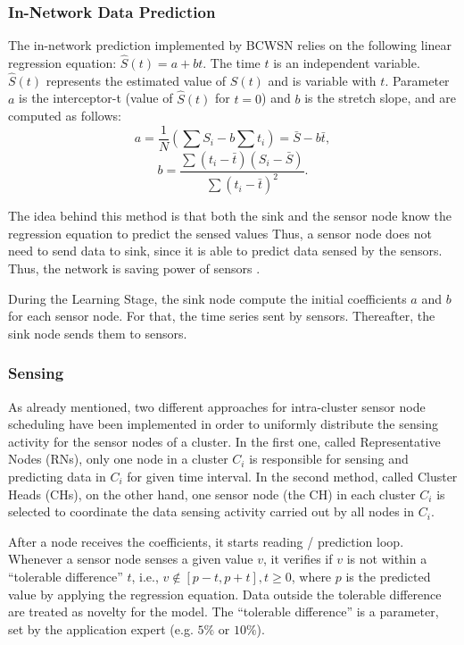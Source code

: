 \documentclass[conference]{IEEEtran}
\begin{document}
\subsubsection{In-Network Data Prediction}
\label{data-predict}


The in-network prediction implemented by BCWSN relies on the
following linear regression equation: $\hat{S}(t) = a + bt$.
The time $t$ is an independent variable. $\hat{S}(t)$ represents the estimated
value of $S(t)$ and is variable with $t$. Parameter $a$ is the interceptor-t
(value of $\hat{S}(t)$ for $t=0$) and $b$ is the stretch slope, and are computed
as follows:
\begin{equation}
	a = \frac{1}{N}\left(\sum S_{i} - b\sum t_{i} \right) = \bar{S} - b\bar{t},
\end{equation}
\vspace*{-.3cm}
\begin{equation}
	b = \frac{\sum \left(t_{i} - \bar{t}\right)\left(S_{i} - \bar{S}\right)}{\sum \left(t_{i} - \bar{t}\right)^{2}}.
\end{equation}

The idea behind this method is that both the sink and the sensor node know the
regression equation to predict the sensed values Thus, a   sensor node does not
need to send data to sink, since it is able to predict data sensed by the
sensors. Thus, the network is saving power of sensors \cite{MaiaACR2013}.

During the Learning Stage, the sink node compute the initial coefficients $a$
and $b$ for each sensor node. For that, the time series sent by sensors.
Thereafter, the sink node sends them to sensors.

 
\subsubsection{Sensing}

As already mentioned, two different approaches for intra-cluster sensor node
scheduling have been implemented in order to uniformly distribute the sensing
activity for the sensor nodes of a cluster. In the first one, called
Representative Nodes (RNs), only one node in a cluster $C_{i}$ is responsible
for sensing and predicting data in $C_{i}$ for given time interval. In the
second method, called Cluster Heads (CHs), on the other hand, one sensor node
(the CH) in each cluster $C_{i}$ is selected to coordinate the data sensing
activity carried out by all nodes in $C_{i}$.

After a node receives the coefficients, it starts reading / prediction loop. 
Whenever a sensor node senses a given value $v$, it verifies if  $v$ is not
within a ``tolerable difference'' $t$, i.e., $v \not \in [p-t,p+t], t \geq 0$,
where $p$ is the predicted value by applying the regression equation. Data
outside the tolerable difference are treated as novelty for the model. The
``tolerable difference'' is a parameter, set by the application expert (e.g.
$5\%$ or $10\%$).
\end{document}

